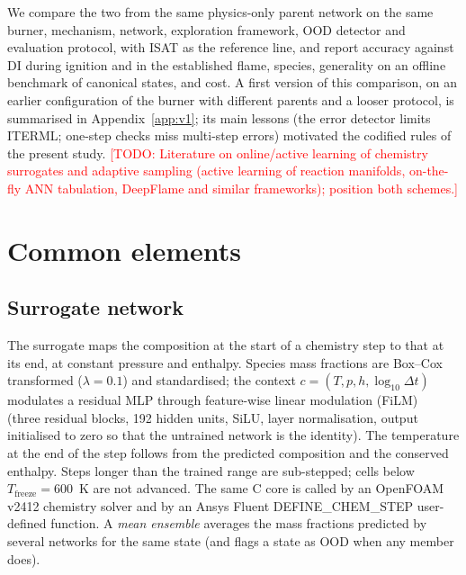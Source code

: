 \documentclass[preprint,review,12pt]{elsarticle}
\newcommand{\todo}[1]{\textcolor{red}{[TODO: #1]}}
\begin{document}
We compare the two from the same physics-only parent network on the same burner, mechanism, network,
exploration framework, OOD detector and evaluation protocol, with ISAT as the reference line, and report
accuracy against DI during ignition and in the established flame, species, generality on an offline
benchmark of canonical states, and cost. A first version of this comparison, on an earlier configuration of
the burner with different parents and a looser protocol, is summarised in Appendix~\ref{app:v1}; its main
lessons (the error detector limits ITERML; one-step checks miss multi-step errors) motivated the codified
rules of the present study.
\todo{Literature on online/active learning of chemistry surrogates and adaptive sampling (active learning of
reaction manifolds, on-the-fly ANN tabulation, DeepFlame and similar frameworks); position both schemes.}

\section{Common elements}
\label{sec:common}

\subsection{Surrogate network}
The surrogate maps the composition at the start of a chemistry step to that at its end, at constant
pressure and enthalpy. Species mass fractions are Box--Cox transformed ($\lambda=0.1$) and standardised;
the context $c=(T,p,h,\log_{10}\Delta t)$ modulates a residual MLP through feature-wise linear modulation
(FiLM)~\cite{perez2018film} (three residual blocks, 192 hidden units, SiLU, layer normalisation, output
initialised to zero so that the untrained network is the identity). The temperature at the end of the
step follows from the predicted composition and the conserved enthalpy. Steps longer than the trained range
are sub-stepped; cells below $T_\mathrm{freeze}=600$~K are not advanced. The same C core is called by an
OpenFOAM v2412 chemistry solver and by an Ansys Fluent DEFINE\_CHEM\_STEP user-defined function. A
\emph{mean ensemble} averages the mass fractions predicted by several networks for the same state (and
flags a state as OOD when any member does).
\end{document}
